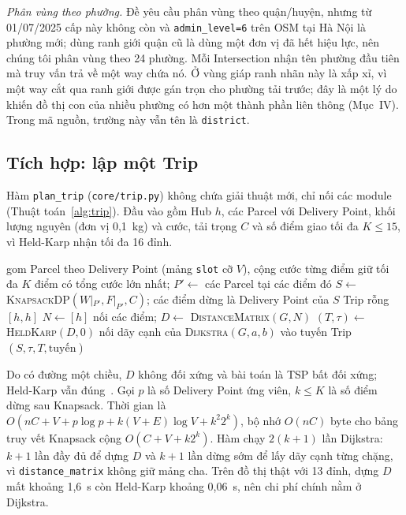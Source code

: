 \emph{Phân vùng theo phường.} Đề yêu cầu phân vùng theo quận/huyện, nhưng từ 01/07/2025 cấp này không còn và \texttt{admin\_level=6} trên OSM tại Hà Nội là phường mới; dùng ranh giới quận cũ là dùng một đơn vị đã hết hiệu lực, nên chúng tôi phân vùng theo 24 phường. Mỗi Intersection nhận tên phường đầu tiên mà truy vấn trả về một way chứa nó. Ở vùng giáp ranh nhãn này là xấp xỉ, vì một way cắt qua ranh giới được gán trọn cho phường tải trước; đây là một lý do khiến đồ thị con của nhiều phường có hơn một thành phần liên thông (Mục~IV). Trong mã nguồn, trường này vẫn tên là \texttt{district}.

\subsection{Tích hợp: lập một Trip}

Hàm \texttt{plan\_trip} (\texttt{core/trip.py}) không chứa giải thuật mới, chỉ nối các module (Thuật toán~\ref{alg:trip}). Đầu vào gồm Hub $h$, các Parcel với Delivery Point, khối lượng nguyên (đơn vị 0,1~kg) và cước, tải trọng $C$ và số điểm giao tối đa $K\le 15$, vì Held-Karp nhận tối đa 16 đỉnh.

\begin{algorithm}[t]
\caption{PlanTrip$(G,h,P,W,F,C,K)$}
\label{alg:trip}
\begin{algorithmic}[1]
\State gom Parcel theo Delivery Point (mảng \texttt{slot} cỡ $V$), cộng cước từng điểm
\State giữ tối đa $K$ điểm có tổng cước lớn nhất; $P' \gets$ các Parcel tại các điểm đó 
\State $S \gets$ \textsc{KnapsackDP}$(W|_{P'},F|_{P'},C)$; các điểm dừng là Delivery Point của $S$ 
 \Return Trip rỗng $[h,h]$ \EndIf
\State $N \gets [h]$ nối các điểm; $D \gets$ \textsc{DistanceMatrix}$(G,N)$
\State $(T,\tau) \gets$ \textsc{HeldKarp}$(D,0)$ 
  \State nối dãy cạnh của \textsc{Dijkstra}$(G,a,b)$ vào tuyến
\EndFor
\State \Return Trip$(S,\tau,T,\text{tuyến})$
\end{algorithmic}
\end{algorithm}

Do có đường một chiều, $D$ không đối xứng và bài toán là TSP bất đối xứng; Held-Karp vẫn đúng~\cite{heldkarp1962}. Gọi $p$ là số Delivery Point ứng viên, $k\le K$ là số điểm dừng sau Knapsack. Thời gian là $O(nC + V + p\log p + k(V+E)\log V + k^2 2^k)$, bộ nhớ $O(nC)$ byte cho bảng truy vết Knapsack cộng $O(C+V+k2^k)$. Hàm chạy $2(k+1)$ lần Dijkstra: $k+1$ lần đầy đủ để dựng $D$ và $k+1$ lần dừng sớm để lấy dãy cạnh từng chặng, vì \texttt{distance\_matrix} không giữ mảng cha. Trên đồ thị thật với 13 đỉnh, dựng $D$ mất khoảng 1,6~s còn Held-Karp khoảng 0,06~s, nên chi phí chính nằm ở Dijkstra.

